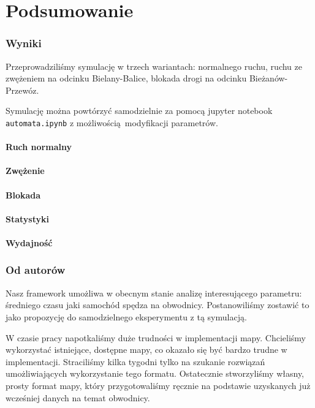 \documentclass[a4paper,12pt]{article}
\begin{document}
    \part{Podsumowanie}

    \section{Wyniki}
    Przeprowadziliśmy symulację w trzech wariantach: normalnego ruchu, ruchu ze zwężeniem na odcinku Bielany-Balice, blokada drogi na odcinku Bieżanów-Przewóz.
    
    Symulację można powtórzyć samodzielnie za pomocą jupyter notebook \texttt{automata.ipynb} z możliwością modyfikacji parametrów.
    
    \subsection{Ruch normalny}
    \subsection{Zwężenie}
    \subsection{Blokada}
    \subsection{Statystyki}
    \subsection{Wydajność}
		
    \section{Od autorów}
    Nasz framework umożliwa w obecnym stanie analizę interesującego parametru: średniego czasu jaki samochód spędza na obwodnicy. Postanowiliśmy zostawić to jako propozycję do samodzielnego eksperymentu z tą symulacją.
    
    W czasie pracy napotkaliśmy duże trudności w implementacji mapy. Chcieliśmy wykorzystać istniejące, dostępne mapy, co okazało się być bardzo trudne w implementacji. Straciliśmy kilka tygodni tylko na szukanie rozwiązań umożliwiających wykorzystanie tego formatu. Ostatecznie stworzyliśmy własny, prosty format mapy, który przygotowaliśmy ręcznie na podstawie uzyskanych już wcześniej danych na temat obwodnicy.
    
\end{document}
